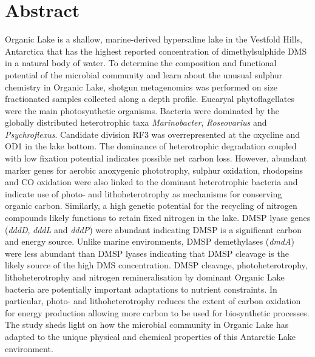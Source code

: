 \section{Abstract}
Organic Lake is a shallow, marine-derived hypersaline lake in the Vestfold Hills, Antarctica that has the highest reported concentration of dimethylsulphide \ac{DMS} in a natural body of water.
To determine the composition and functional potential of the microbial community and learn about the unusual sulphur chemistry in Organic Lake, shotgun metagenomics was performed on size fractionated samples collected along a depth profile.
Eucaryal phytoflagellates were the main photosynthetic organisms.
Bacteria were dominated by the globally distributed heterotrophic taxa \emph{Marinobacter}, \emph{Roseovarius} and \emph{Psychroflexus}.
Candidate division RF3 was overrepresented at the oxycline and OD1 in the lake bottom.
The dominance of heterotrophic degradation coupled with low fixation potential indicates possible net carbon loss.
However, abundant marker genes for aerobic anoxygenic phototrophy, sulphur oxidation, rhodopsins and CO oxidation were also linked to the dominant heterotrophic bacteria and indicate use of photo- and lithoheterotrophy as mechanisms for conserving organic carbon.
Similarly, a high genetic potential for the recycling of nitrogen compounds likely functions to retain fixed nitrogen in the lake.
\ac{DMSP} lyase genes (\emph{dddD}, \emph{dddL} and \emph{dddP}) were abundant indicating \ac{DMSP} is a significant carbon and energy source.
Unlike marine environments, \ac{DMSP} demethylases (\emph{dmdA}) were less abundant than \ac{DMSP} lyases indicating that \ac{DMSP} cleavage is the likely source of the high \ac{DMS} concentration.
\ac{DMSP} cleavage, photoheterotrophy, lithoheterotrophy and nitrogen remineralisation by dominant Organic Lake bacteria are potentially important adaptations to nutrient constraints.
In particular, photo- and lithoheterotrophy reduces the extent of carbon oxidation for energy production allowing more carbon to be used for biosynthetic processes.
The study sheds light on how the microbial community in Organic Lake has adapted to the unique physical and chemical properties of this Antarctic Lake environment.

\newpage

\acresetall
